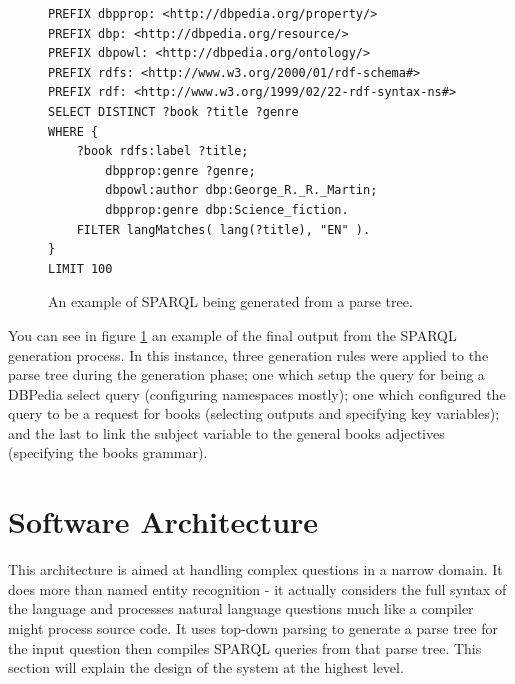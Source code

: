 \documentclass[11pt]{article}
\begin{document}
{\begin{figure}[h!]
\begin{verbatim}
PREFIX dbpprop: <http://dbpedia.org/property/>
PREFIX dbp: <http://dbpedia.org/resource/>
PREFIX dbpowl: <http://dbpedia.org/ontology/>
PREFIX rdfs: <http://www.w3.org/2000/01/rdf-schema#>
PREFIX rdf: <http://www.w3.org/1999/02/22-rdf-syntax-ns#>
SELECT DISTINCT ?book ?title ?genre
WHERE {
    ?book rdfs:label ?title;
        dbpprop:genre ?genre;
        dbpowl:author dbp:George_R._R._Martin;
        dbpprop:genre dbp:Science_fiction.
    FILTER langMatches( lang(?title), "EN" ).
}
LIMIT 100
\end{verbatim}
\caption{An example of SPARQL being generated from a parse tree.}
\label{fig:gen_example}
\end{figure}

You can see in figure \ref{fig:gen_example} an example of the final output from the
SPARQL generation process. In this instance, three generation rules were applied to
the parse tree during the generation phase; one which setup the query for being
a DBPedia select query (configuring namespaces mostly); one which configured
the query to be a request for books (selecting outputs and specifying key variables);
and the last to link the subject variable to the general books adjectives (specifying
the books grammar). 

\clearpage

\section{Software Architecture}

This architecture is aimed at handling complex questions in a narrow domain.
It does more than named entity recognition - it actually considers
the full syntax of the language and processes natural language questions
much like a compiler might process source code. It uses
top-down parsing to generate a parse tree for the input question then
compiles SPARQL queries from that parse tree.
This section will explain the design of the system at the highest level.

}
\end{document}
